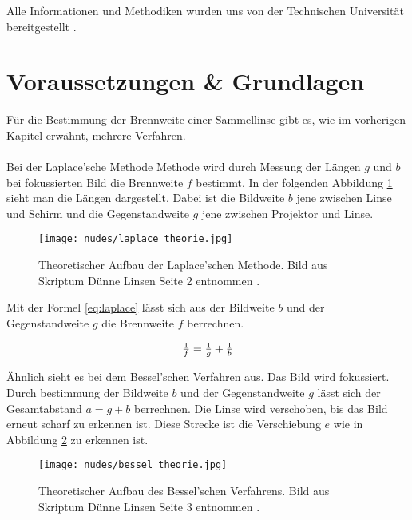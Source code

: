 \documentclass[12pt,a4paper,twoside]{article}
\begin{document}
\noindent
Alle Informationen und Methodiken wurden uns von der Technischen Universität bereitgestellt \cite{teachcenter2}. 

\section{Voraussetzungen \& Grundlagen} %
Für die Bestimmung der Brennweite einer Sammellinse gibt es, wie im vorherigen Kapitel erwähnt, mehrere Verfahren. 
\\
\\
Bei der Laplace'sche Methode Methode wird durch Messung der Längen $g$ und $b$ bei fokussierten Bild die Brennweite $f$ bestimmt. 
In der folgenden Abbildung \ref{fig:laplace_theorie} sieht man die Längen dargestellt. Dabei ist die Bildweite $b$ jene zwischen Linse und Schirm und die Gegenstandweite $g$ jene zwischen Projektor und Linse. 

\begin{figure}[H]
    \centering
    \texttt{[image: nudes/laplace\_theorie.jpg]}
    \caption{Theoretischer Aufbau der Laplace'schen Methode. Bild aus Skriptum Dünne Linsen Seite 2 entnommen \cite{teachcenter2}. }
    \label{fig:laplace_theorie}
\end{figure}

\noindent
Mit der Formel \ref{eq:laplace} lässt sich aus der Bildweite $b$ und der Gegenstandweite $g$ die Brennweite $f$ berrechnen. 

\begin{equation}
    \label{eq:laplace}
    \centerline{$\frac{1}{f}=\frac{1}{g} + \frac{1}{b}$}
\end{equation}

\noindent
Ähnlich sieht es bei dem Bessel'schen Verfahren aus. Das Bild wird fokussiert. Durch bestimmung der Bildweite $b$ und der Gegenstandweite $g$ lässt sich der Gesamtabstand $a = g+b$ berrechnen. 
Die Linse wird verschoben, bis das Bild erneut scharf zu erkennen ist. Diese Strecke ist die Verschiebung $e$ wie in Abbildung \ref{fig:bessel_theorie} zu erkennen ist.  

\begin{figure}[H]
    \centering
    \texttt{[image: nudes/bessel\_theorie.jpg]}
    \caption{Theoretischer Aufbau des Bessel'schen Verfahrens. Bild aus Skriptum Dünne Linsen Seite 3 entnommen \cite{teachcenter2}. }
    \label{fig:bessel_theorie}
\end{figure}
\end{document}
